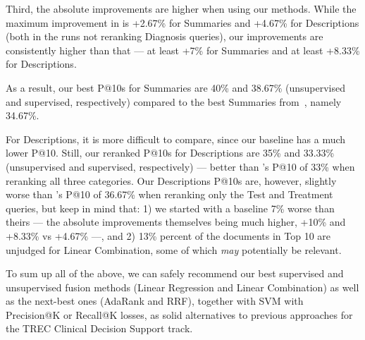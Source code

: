 Third, the absolute improvements are higher when using our methods.
While the maximum improvement
in \cite{choi} is +2.67\% for Summaries and +4.67\% for Descriptions (both in the runs not reranking Diagnosis queries),
our improvements are consistently
higher than that --- at least +7\% for Summaries and at least +8.33\% for Descriptions.

As a result, our best P@10s for Summaries are 40\% and 38.67\%
(unsupervised and supervised, respectively) compared to the best Summaries from~\cite{choi}, namely 34.67\%.

For Descriptions, it is more difficult to compare, since our baseline has a much lower P@10.
Still, our reranked P@10s for Descriptions are 35\% and 33.33\% (unsupervised and supervised, respectively)
 --- better than \cite{choi}'s P@10 of 33\% when reranking all three categories.
Our Descriptions P@10s are, however, slightly worse
than \cite{choi}'s P@10 of 36.67\% when reranking only the Test and Treatment queries, but keep in mind that:
1) we started with a baseline 7\% worse than theirs --- the absolute improvements themselves being much higher, +10\% and +8.33\%
vs +4.67\% ---, and 2) 13\% percent of the documents in Top 10 are unjudged for Linear Combination,
some of which \emph{may} potentially be relevant.

To sum up all of the above, we can safely recommend our best supervised and unsupervised fusion methods
(Linear Regression and Linear Combination) as well as the next-best ones (AdaRank and RRF),
together with SVM with Precision@K or Recall@K losses,
as solid alternatives to previous approaches for the TREC Clinical Decision Support track.


%








